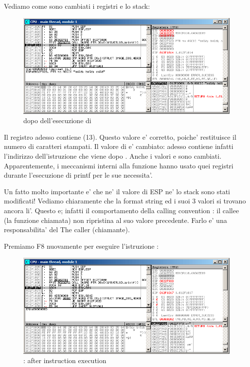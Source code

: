 Vediamo come sono cambiati i registri e lo stack:

\begin{figure}[H]
\centering
\includegraphics[scale=\FigScale]{patterns/03_printf/x86/olly3_3.png}
\caption{\olly dopo dell'esecuzione di \printf{}}
\label{fig:printf3_olly_3}
\end{figure}

Il registro \EAX adesso contiene  (13).
Questo valore e' corretto, poiche' \printf restituisce il numero di caratteri stampati. 
Il valore di \EIP e' cambiato: adesso contiene infatti l'indirizzo dell'istruzione che viene dopo .
Anche i valori \ECX e \EDX sono cambiati.
Apparentemente, i meccanismi interni alla funzione \printf hanno usato quei registri durante l'esecuzione di printf per le sue necessita'.

Un fatto molto importante e' che ne' il valore di ESP ne' lo stack sono stati modificati!
Vediamo chiaramente che la format string ed i suoi 3 valori si trovano ancora li'.
Questo e; infatti il comportamento della calling convention : il \gls{callee} (la funzione chiamata) non ripristina
\ESP al suo valore precedente. Farlo e' una responsabilita' del The \gls{caller} (chiamante).

\clearpage
Premiamo F8 nuovamente per eseguire l'istruzione :

\begin{figure}[H]
\centering
\includegraphics[scale=\FigScale]{patterns/03_printf/x86/olly3_4.png}
\caption{\olly: after  instruction execution}
\label{fig:printf3_olly_4}
\end{figure}

